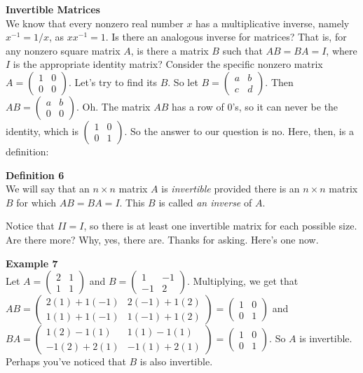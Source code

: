 \documentclass[12pt]{article}
\def\Idd{\begin{pmatrix} 1 & 0 \\ 0 & 1 \end{pmatrix}}
\begin{document}
\noindent
{\bf Invertible Matrices} \\
We know that every nonzero real number $x$ has a multiplicative inverse, namely $x^{-1} = 1/x$, as $x x^{-1} = 1$. Is there an analogous inverse for matrices? That is, for any nonzero square matrix $A$, is there a matrix $B$ such that $AB = BA = I$, where $I$ is the appropriate identity matrix? Consider the specific nonzero matrix $A = \begin{pmatrix} 1 & 0 \\ 0 & 0 \end{pmatrix}$. Let's try to find its $B$. So let $B = \begin{pmatrix} a & b \\ c & d \end{pmatrix}$. Then $AB = \begin{pmatrix} a & b \\ 0 & 0 \end{pmatrix}$. Oh. The matrix $AB$ has a row of $0$'s, so it can never be the identity, which is $\Idd$. So the answer to our question is no. Here, then, is a definition:

\noindent
{\bf Definition 6} \\
We will say that an $n \times n$ matrix $A$ is {\itshape invertible} provided there is an $n \times n$ matrix $B$ for which $AB = BA = I$. This $B$ is called {\itshape an inverse} of $A$. 

Notice that $II = I$, so there is at least one invertible matrix for each possible size. Are there more? Why, yes, there are. Thanks for asking. Here's one now.

\noindent
{\bf Example 7} \\
Let $A = \begin{pmatrix} 2 & 1 \\ 1 & 1 \end{pmatrix}$ and $B = \begin{pmatrix} 1 & -1 \\ -1 & 2 \end{pmatrix}$. Multiplying, we get that
$AB = \begin{pmatrix} 2(1)+1(-1) & 2(-1)+1(2) \\ 1(1)+ 1(-1) & 1(-1)+1(2) \end{pmatrix} = \Idd$ and $BA = \begin{pmatrix} 1(2)-1(1) & 1(1)-1(1) \\
-1(2)+2(1) & -1(1)+2(1) \end{pmatrix} = \Idd$. So $A$ is invertible. Perhaps you've noticed that $B$ is also invertible.
\end{document}
